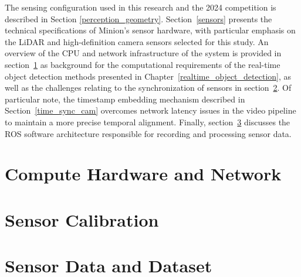 \documentclass{erauthesis}
\begin{document}
The sensing configuration used in this research and the 2024 competition is described in Section \ref{perception_geometry}.
Section~\ref{sensors} presents the technical specifications of Minion's sensor hardware, with particular emphasis on the \ac{LiDAR} and high-definition camera sensors selected for this study.
An overview of the CPU and network infrastructure of the system is provided in section~\ref{sec:Atlas_LAN} as background for the computational requirements of the real-time object detection methods presented in Chapter~\ref{realtime_object_detection}, as well as the challenges relating to the synchronization of sensors in section~\ref{sec:calibration}.
Of particular note, the timestamp embedding mechanism described in Section~\ref{time_sync_cam} overcomes network latency issues in the video pipeline to maintain a more precise temporal alignment.
Finally, section~\ref{sec:sensor_data_dataset} discusses the \ac{ROS} software architecture responsible for recording and processing sensor data.





\section{Compute Hardware and Network} \label{sec:Atlas_LAN}


\section{Sensor Calibration} \label{sec:calibration}


\section{Sensor Data and Dataset} \label{sec:sensor_data_dataset}

\end{document}

